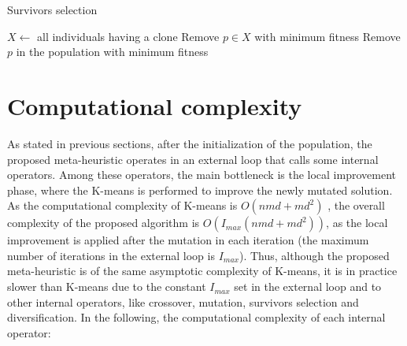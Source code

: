 \begin{algorithm}[H]
\caption{Survivors selection}
\label{survivors}
\begin{algorithmic}[1]
\STATE $X \leftarrow $ all individuals having a clone
\STATE Remove $p \in X$ with minimum fitness
\ELSE
\STATE Remove $p$ in the population with minimum fitness
\ENDIF
\ENDFOR
\end{algorithmic}
\end{algorithm}


\section{Computational complexity}
\label{sec:complexity-algo}
As stated in previous sections, after the initialization of the population, the proposed meta-heuristic operates in an external loop that calls some internal operators. Among these operators, the main bottleneck is the local improvement phase, where the K-means is performed to improve the newly mutated solution. As the computational complexity of K-means is $O(nmd + md^2)$ \cite{Hamerly2010}, the overall complexity of the proposed algorithm is $O(I_{max} (nmd + md^2))$, as the local improvement is applied after the mutation in each iteration (the maximum number of iterations in the external loop is $I_{max}$). Thus, although the proposed meta-heuristic is of the same asymptotic complexity of K-means, it is in practice slower than K-means due to the constant $I_{max}$ set in the external loop and to other internal operators, like crossover, mutation, survivors selection and diversification. In the following, the computational complexity of each internal operator:

